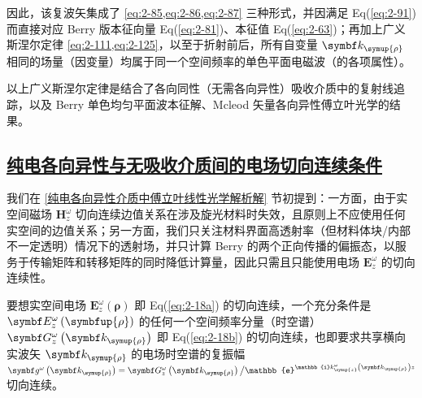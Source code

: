 因此，该复波矢集成了 \cref{eq:2-85,eq:2-86,eq:2-87} 三种形式，并因满足 Eq(\ref{eq:2-91}) 而直接对应 Berry 版本征向量 Eq(\ref{eq:2-81})、本征值 Eq(\ref{eq:2-63})；再加上广义斯涅尔定律 \cref{eq:2-111,eq:2-125}，以至于折射前后，所有自变量 $\symbf k_{\symup{\rho}}$ 相同的场量（因变量）均属于同一个空间频率的单色平面电磁波（的各项属性）。

以上广义斯涅尔定律是结合了各向同性（无需各向异性\cite{wangComplexRayTracing2008a,wangComplexRayTracing2008}）吸收介质中的复射线追踪\cite{changRayTracingAbsorbing2005}，以及 Berry 单色均匀平面波本征解\cite{berryOpticalSingularitiesBirefringent2003}、Mcleod 矢量各向异性傅立叶光学\cite{mcleodVectorFourierOptics2014}的结果。

\subsection{\protect\hyperlink{chap:\thesubsection}{纯电各向异性与无吸收介质间的电场切向连续条件}}
\label{纯电各向异性与无吸收介质间的电场切向连续条件}

我们在 \ref{纯电各向异性介质中傅立叶线性光学解析解} 节初提到：一方面，由于实空间磁场 $\symbf H^{\omega}_z$ 切向连续边值关系在涉及旋光材料时失效，且原则上不应使用任何实空间的边值关系\cite{chenWavevectorspaceMethodWave1993,nelsonDerivingTransmissionReflection1995}；另一方面，我们只关注材料界面高透射率（但材料体块/内部不一定透明）情况下的透射场，并只计算 Berry 的两个正向传播的偏振态，以服务于传输矩阵和转移矩阵的同时降低计算量，因此只需且只能使用电场 $\symbf E^{\omega}_z$ 的切向连续性。

要想实空间电场 $\symbf E^{\omega}_z \left( \symbf{\rho} \right)$ 即 Eq(\ref{eq:2-18a}) 的切向连续，一个充分条件是 $\symbf E^{\omega}_z \left( \symbfup{\rho} \right)$ 的任何一个空间频率分量（时空谱） $\symbf G^{\omega}_z \left( \symbf k_{\symup{\rho}} \right)$ 即 Eq(\ref{eq:2-18b}) 的切向连续，也即要求共享横向实波矢 $\symbf k_{\symup{\rho}}$ 的电场时空谱的复振幅 $\symbf g^{\omega} \left( \symbf k_{\symup{\rho}} \right) = \symbf G^{\omega}_z \left( \symbf k_{\symup{\rho}} \right) \big/ \mathbb{e}^{\mathbb{i} k^\omega_{\symup{z}} \left( \symbf k_{\symup{\rho}} \right) z}$ 切向连续。

